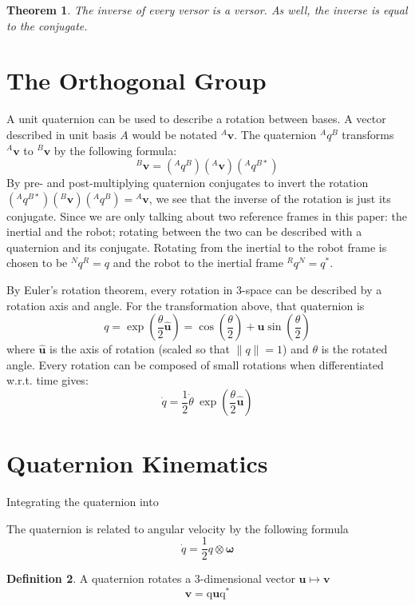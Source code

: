 \documentclass{amsart}
\newtheorem{theorem}{Theorem}[section]
\theoremstyle{definition}
\newtheorem{definition}[theorem]{Definition}
\theoremstyle{remark}
\numberwithin{equation}{section}
\begin{document}
\begin{theorem}
  The inverse of every versor is a versor. As well, the inverse is equal to the conjugate.
\end{theorem}


\section{The Orthogonal Group}
A unit quaternion can be used to describe a rotation between bases. A vector described in unit basis $A$ would be notated $^A\mathbf{v}$. The quaternion $^Aq^B$ transforms $^A\mathbf{v}$ to $^B\mathbf{v}$ by the following formula:
\begin{equation}
  {^B\mathbf{v}} = \left({^Aq^B}\right)\left( {^A\mathbf{v}}\right)\left( {^Aq^{B*}}\right)
\end{equation}
By pre- and post-multiplying quaternion conjugates to invert the rotation $\left({^Aq^{B*}}\right)\left({^B\mathbf{v}}\right)\left({^Aq^B}\right)={^A\mathbf{v}}$, we see that the inverse of the rotation is just its conjugate. Since we are only talking about two reference frames in this paper: the inertial and the robot; rotating between the two can be described with a quaternion and its conjugate. Rotating from the inertial to the robot frame is chosen to be ${^Nq^R}=q$ and the robot to the inertial frame ${^Rq^N}=q^*$.

By Euler's rotation theorem, every rotation in 3-space can be described by a rotation axis and angle. For the transformation above, that quaternion is
\begin{equation}
  q = \exp\left(\frac{\theta}{2}\hat{\mathbf{u}}\right) = \cos\left(\frac{\theta}{2}\right) + \mathbf{u} \sin\left( \frac{\theta}{2}\right)
\end{equation}
where $\hat{\mathbf{u}}$ is the axis of rotation (scaled so that $\|q\|=1$) and $\theta$ is the rotated angle. Every rotation can be composed of small rotations when differentiated w.r.t. time gives:
\begin{equation}
  \dot{q} = \frac{1}{2} \dot{\theta} \ \exp\left(\frac{\theta}{2} \hat{\mathbf{u}} \right)
\end{equation}

\section*{Quaternion Kinematics}
Integrating the quaternion into

The quaternion is related to angular velocity by the following formula
\begin{equation}
  \dot{q} = \frac{1}{2} q \otimes \boldsymbol\omega
\end{equation}
%
\begin{definition}
  A quaternion rotates a 3-dimensional vector $\mathbf{u} \mapsto \mathbf{v}$
  \begin{equation}
    \mathbf{v} = \mathrm{q}\mathbf{u}\mathrm{q}^*
  \end{equation}
\end{definition}
\end{document}
